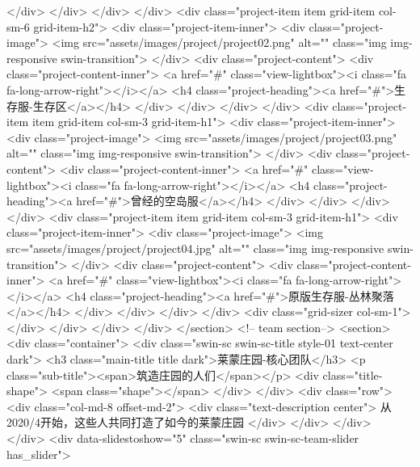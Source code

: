            </div> 
          </div> 
         </div> 
        </div> 
        <div class="project-item item grid-item col-sm-6 grid-item-h2"> 
         <div class="project-item-inner"> 
          <div class="project-image">
           <img src="assets/images/project/project02.png" alt="" class="img img-responsive swin-transition">
          </div> 
          <div class="project-content"> 
           <div class="project-content-inner">
            <a href="#" class="view-lightbox"><i class="fa fa-long-arrow-right"></i></a> 
            <h4 class="project-heading"><a href="#">生存服-生存区</a></h4> 
           </div> 
          </div> 
         </div> 
        </div> 
        <div class="project-item item grid-item col-sm-3 grid-item-h1"> 
         <div class="project-item-inner"> 
          <div class="project-image">
           <img src="assets/images/project/project03.png" alt="" class="img img-responsive swin-transition">
          </div> 
          <div class="project-content"> 
           <div class="project-content-inner">
            <a href="#" class="view-lightbox"><i class="fa fa-long-arrow-right"></i></a> 
            <h4 class="project-heading"><a href="#">曾经的空岛服</a></h4> 
           </div> 
          </div> 
         </div> 
        </div> 
        <div class="project-item item grid-item col-sm-3 grid-item-h1"> 
         <div class="project-item-inner"> 
          <div class="project-image">
           <img src="assets/images/project/project04.jpg" alt="" class="img img-responsive swin-transition">
          </div> 
          <div class="project-content"> 
           <div class="project-content-inner">
            <a href="#" class="view-lightbox"><i class="fa fa-long-arrow-right"></i></a> 
            <h4 class="project-heading"><a href="#">原版生存服-丛林聚落</a></h4> 
           </div> 
          </div> 
         </div> 
        </div> 
        <div class="grid-sizer col-sm-1"></div> 
       </div> 
      </div> 
     </div> 
    </section> 
    <!-- team section--> 
    <section> 
     <div class="container"> 
      <div class="swin-sc swin-sc-title style-01 text-center dark"> 
       <h3 class="main-title title dark">莱蒙庄园-核心团队</h3> 
       <p class="sub-title"><span>筑造庄园的人们</span></p> 
       <div class="title-shape">
        <span class="shape"></span>
       </div> 
      </div> 
      <div class="row"> 
       <div class="col-md-8 offset-md-2"> 
        <div class="text-description center">
         从2020/4开始，这些人共同打造了如今的莱蒙庄园
        </div> 
       </div> 
      </div> 
     </div> 
     <div data-slidestoshow="5" class="swin-sc swin-sc-team-slider has_slider"> 
